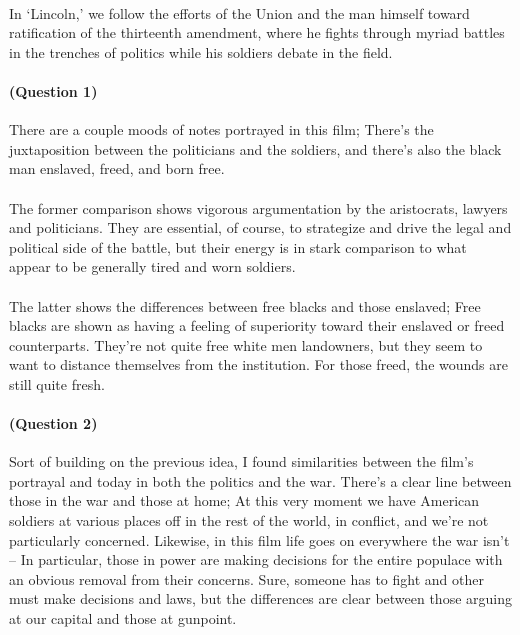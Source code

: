 \documentclass[13pt]{article}
\begin{document}

\pagebreak

\paragraph{} In `Lincoln,' we follow the efforts of the Union and the man himself toward ratification of the thirteenth amendment, where he fights through myriad battles in the trenches of politics while his soldiers debate in the field.

\paragraph{(Question 1)} There are a couple moods of notes portrayed in this film; There's the juxtaposition between the politicians and the soldiers, and there's also the black man enslaved, freed, and born free. \\
\paragraph{} The former comparison shows vigorous argumentation by the aristocrats, lawyers and politicians. They are essential, of course, to strategize and drive the legal and political side of the battle, but their energy is in stark comparison to what appear to be generally tired and worn soldiers.
\paragraph{} The latter shows the differences between free blacks and those enslaved; Free blacks are shown as having a feeling of superiority toward their enslaved or freed counterparts. They're not quite free white men landowners, but they seem to want to distance themselves from the institution. For those freed, the wounds are still quite fresh.


\paragraph{(Question 2)} Sort of building on the previous idea, I found similarities between the film's portrayal and today in both the politics and the war. There's a clear line between those in the war and those at home; At this very moment we have American soldiers at various places off in the rest of the world, in conflict, and we're not particularly concerned. Likewise, in this film life goes on everywhere the war isn't -- In particular, those in power are making decisions for the entire populace with an obvious removal from their concerns. Sure, someone has to fight and other must make decisions and laws, but the differences are clear between those arguing at our capital and those at gunpoint.
\end{document}
